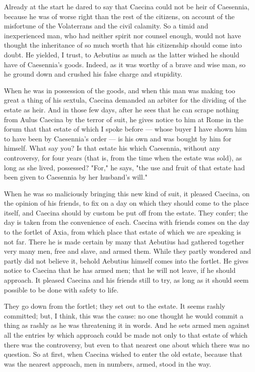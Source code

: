  Already at the start he dared to say that Caecina could not be heir of Caesennia, because he was of worse right than the rest of the citizens, on account of the misfortune of the Volaterrans and the civil calamity. So a timid and inexperienced man, who had neither spirit nor counsel enough, would not have thought the inheritance of so much worth that his citizenship should come into doubt. He yielded, I trust, to Aebutius as much as the latter wished he should have of Caesennia's goods. Indeed, as it was worthy of a brave and wise man, so he ground down and crushed his false charge and stupidity.

 When he was in possession of the goods, and when this man was making too great a thing of his sextula, Caecina demanded an arbiter for the dividing of the estate as heir. And in those few days, after he sees that he can scrape nothing from Aulus Caecina by the terror of suit, he gives notice to him at Rome in the forum that that estate of which I spoke before --- whose buyer I have shown him to have been by Caesennia's order --- is his own and was bought by him for himself. What say you? Is that estate his which Caesennia, without any controversy, for four years (that is, from the time when the estate was sold), as long as she lived, possessed? "For," he says, "the use and fruit of that estate had been given to Caesennia by her husband's will."

 When he was so maliciously bringing this new kind of suit, it pleased Caecina, on the opinion of his friends, to fix on a day on which they should come to the place itself, and Caecina should by custom be put off from the estate. They confer; the day is taken from the convenience of each. Caecina with friends comes on the day to the fortlet of Axia, from which place that estate of which we are speaking is not far. There he is made certain by many that Aebutius had gathered together very many men, free and slave, and armed them. While they partly wondered and partly did not believe it, behold Aebutius himself comes into the fortlet. He gives notice to Caecina that he has armed men; that he will not leave, if he should approach. It pleased Caecina and his friends still to try, as long as it should seem possible to be done with safety to life.

 They go down from the fortlet; they set out to the estate. It seems rashly committed; but, I think, this was the cause: no one thought he would commit a thing as rashly as he was threatening it in words. And he sets armed men against all the entries by which approach could be made not only to that estate of which there was the controversy, but even to that nearest one about which there was no question. So at first, when Caecina wished to enter the old estate, because that was the nearest approach, men in numbers, armed, stood in the way.

